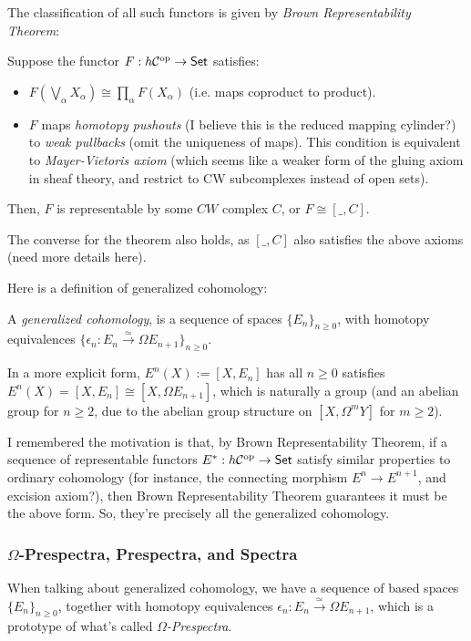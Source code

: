 \documentclass{article}
\begin{document}
The classification of all such functors is given by \emph{Brown Representability Theorem}:
\begin{thm}
Suppose the functor $F:h\mathcal{C}^{\mathrm{op}}\rightarrow \mathsf{Set}$ satisfies:
\begin{itemize}
    \item $F(\bigvee_\alpha X_\alpha)\cong \prod_\alpha F(X_\alpha)$ (i.e. maps coproduct to product).
    \item $F$ maps \emph{homotopy pushouts} (I believe this is the reduced mapping cylinder?) to \emph{weak pullbacks} (omit the uniqueness of maps). This condition is equivalent to \emph{Mayer-Vietoris axiom} (which seems like a weaker form of the gluing axiom in sheaf theory, and restrict to CW subcomplexes instead of open sets).
\end{itemize}
Then, $F$ is representable by some $CW$ complex $C$, or $F\cong [\_,C]$.
\end{thm}
The converse for the theorem also holds, as $[\_,C]$ also satisfies the above axioms (need more details here). 

\hfil

Here is a definition of generalized cohomology:

\begin{defn}
A \emph{generalized cohomology}, is a sequence of spaces $\{E_n\}_{n\geq 0}$, with homotopy equivalences $\{\epsilon_n:E_n \xrightarrow{\simeq} \Omega E_{n+1}\}_{n\geq 0}$. 

In a more explicit form, $E^n(X) := [X,E_n]$ has all $n\geq 0$ satisfies $E^n(X) = [X,E_n]\cong [X,\Omega E_{n+1}]$, which is naturally a group (and an abelian group for $n\geq 2$, due to the abelian group structure on $[X,\Omega^m Y]$ for $m\geq 2$).
\end{defn}
I remembered the motivation is that, by Brown Representability Theorem, if a sequence of representable functors $E^*:h\mathcal{C}^{\mathrm{op}}\rightarrow \mathsf{Set}$ satisfy similar properties to ordinary cohomology (for instance, the connecting morphism $E^n\rightarrow E^{n+1}$, and excision axiom?), then Brown Representability Theorem guarantees it must be the above form. So, they're precisely all the generalized cohomology.

\hfil

\subsubsection{$\Omega$-Prespectra, Prespectra, and Spectra}
When talking about generalized cohomology, we have a sequence of based spaces $\{E_n\}_{n\geq 0}$, together with homotopy equivalences $\epsilon_n:E_n \xrightarrow{\simeq}\Omega E_{n+1}$, which is a prototype of what's called \emph{$\Omega$-Prespectra}.
\end{document}
